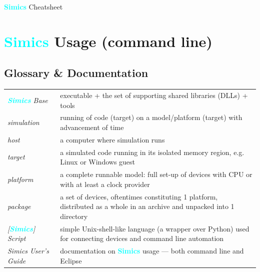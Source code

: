 \documentclass[8pt]{extarticle}
\newcommand{\cod}[2][green!10]{\tcbox[
    size=fbox,
    on line,
    colback=#1,
    colframe=black,
    arc=0.3em  %
]{#2}}
\newcommand{\Simics}{\textcolor{cyan}{\textbf{Simics}}}
\newlength{\MyLen}
\begin{document}
\setlength\emergencystretch{\hsize}


\ifdefined\cheatsheetCompact
\begin{multicols*}{3}
\fi
    {\Large\centering \Simics{} Cheatsheet\par}

\ifdefined\cheatsheetCompact
\vspace{0.2cm}
\fi

\section{\Simics{} Usage (command line)}

\subsection{Glossary \& Documentation}
    \noindent\begin{tabular}{p{\the\MyLen}p{\linewidth-\the\MyLen-0.8cm}}
        \textit{\Simics{} Base} & \cod{simics} executable + the set of
        supporting shared libraries (DLLs) + tools
        \\
        \textit{simulation}  & running of code (target) on
        a model/platform (target) with advancement of time
        \\
        \textit{host}        & a computer where simulation runs
        \\
        \textit{target}      & a simulated
        code running in its isolated memory region, e.g. Linux or
        Windows guest
        \\
        \textit{platform}  & a complete runnable model:
        full set-up of devices
        with CPU or with at least a clock provider
        \\
        \textit{package}   & a set of devices, oftentimes constituting
        1 platform, distributed as a whole in an archive and unpacked
        into 1 directory
        \\
        \textit{[\Simics] Script} & simple Unix-shell-like language (a wrapper
        over Python) used for connecting devices and command line 
        automation
        \\
        \textit{Simics User’s Guide} & documentation on \Simics{}
        usage — both command line and Eclipse
    \end{tabular}


\end{multicols*}
\end{document}
